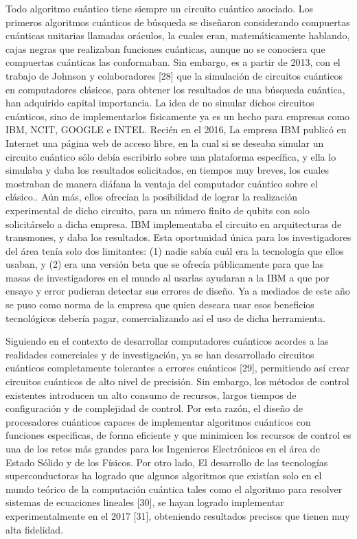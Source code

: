 Todo algoritmo cuántico tiene siempre un circuito cuántico asociado. Los primeros algoritmos cuánticos de búsqueda se diseñaron considerando compuertas cuánticas unitarias llamadas oráculos, la cuales eran, matemáticamente hablando, cajas negras que realizaban funciones cuánticas, aunque no se conociera que compuertas cuánticas las conformaban. Sin embargo, es a partir de 2013, con el trabajo de Johnson y colaboradores [28] que la simulación de circuitos cuánticos en computadores clásicos, para obtener los resultados de una búsqueda cuántica, han adquirido capital importancia. La idea de no simular dichos circuitos cuánticos, sino de implementarlos físicamente ya es un hecho para empresas como IBM, NCIT, GOOGLE e INTEL. Recién en el 2016, La empresa IBM publicó en Internet una página web de acceso libre, en la cual si se deseaba simular un circuito cuántico sólo debía escribirlo sobre una plataforma específica, y ella lo simulaba y daba los resultados solicitados, en tiempos muy breves, los cuales mostraban de manera diáfana la ventaja del computador cuántico sobre el clásico.. Aún más, ellos ofrecían la posibilidad de lograr la realización experimental de dicho circuito, para un número finito de qubits con solo solicitárselo a dicha empresa. IBM implementaba el circuito en arquitecturas de transmones, y daba los resultados. Esta oportunidad única para los investigadores del área tenía solo dos limitantes: (1) nadie sabía cuál era la tecnología que ellos usaban, y (2) era una versión beta que se ofrecía públicamente para que las masas de investigadores en el mundo al usarlas ayudaran a la IBM a que por ensayo y error pudieran detectar sus errores de diseño. Ya a mediados de este año se puso como norma de la empresa que quien deseara usar esos beneficios tecnológicos debería pagar, comercializando así el uso de dicha herramienta.

Siguiendo en el contexto de desarrollar computadores cuánticos acordes a las realidades comerciales y de investigación, ya se han desarrollado circuitos cuánticos completamente tolerantes a errores cuánticos [29], permitiendo así crear circuitos cuánticos de alto nivel de precisión. Sin embargo, los métodos de control existentes introducen un alto consumo de recursos, largos tiempos de configuración y de complejidad de control. Por esta razón, el diseño de procesadores cuánticos capaces de implementar algoritmos cuánticos con funciones especificas, de forma eficiente y que minimicen los recursos de control es una de los retos más grandes para los Ingenieros Electrónicos en el área de Estado Sólido y de los Físicos.  Por otro lado, El desarrollo de las tecnologías superconductoras ha logrado que algunos algoritmos que existían solo en el mundo teórico de la computación cuántica tales como el algoritmo para resolver sistemas de ecuaciones lineales [30], se hayan logrado implementar experimentalmente en el 2017 [31], obteniendo resultados precisos que tienen muy alta fidelidad.

